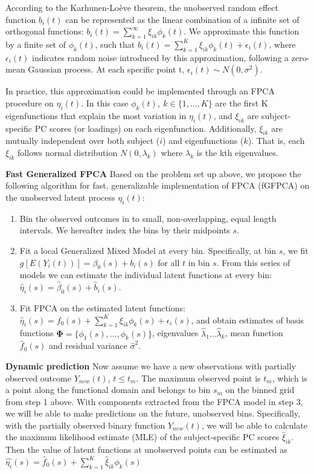 \documentclass[
  11pt,
]{article}
\providecommand{\tightlist}{%
  \setlength{\itemsep}{0pt}\setlength{\parskip}{0pt}}
\begin{document}
According to the Karhunen-Loève theorem, the unobserved random effect
function \(b_i(t)\) can be represented as the linear combination of a
infinite set of orthogonal functions:
\(b_i(t)=\sum_{k=1}^{\infty}\xi_{ik}\phi_{k}(t)\). We approximate this
function by a finite set of \(\phi_{k}(t)\), such that
\(b_i(t)=\sum_{k=1}^{K}\xi_{ik}\phi_{k}(t)+\epsilon_i(t)\), where
\(\epsilon_i(t)\) indicates random noise introduced by this
approximation, following a zero-mean Gaussian process. At each specific
point t, \(\epsilon_i(t) \sim N(0, \sigma^2)\).

In practice, this approximation could be implemented through an FPCA
procedure on \(\eta_i(t)\). In this case
\(\phi_{k}(t),\ k \in \{1,...,K\}\) are the first K eigenfunctions that
explain the most variation in \(\eta_i(t)\), and \(\xi_{ik}\) are
subject-specific PC scores (or loadings) on each eigenfunction.
Additionally, \(\xi_{ik}\) are mutually independent over both subject
(\(i\)) and eigenfunctions (\(k\)). That is, each \(\xi_{ik}\) follows
normal distribution \(N(0, \lambda_k)\) where \(\lambda_k\) is the kth
eigenvalues.

\textbf{Fast Generalized FPCA} Based on the problem set up above, we
propose the following algorithm for fast, generalizable implementation
of FPCA (fGFPCA) on the unobserved latent process \(\eta_i(t)\):

\begin{enumerate}
\def\labelenumi{\arabic{enumi}.}
\tightlist
\item
  Bin the observed outcomes in to small, non-overlapping, equal length
  intervals. We hereafter index the bins by their midpoints \(s\).
\item
  Fit a local Generalized Mixed Model at every bin. Specifically, at bin
  \(s\), we fit \(g[E(Y_i(t))] = \beta_0(s)+b_i(s)\) for all \(t\) in
  bin \(s\). From this series of models we can estimate the individual
  latent functions at every bin:
  \(\hat{\eta}_i(s) = \hat{\beta}_0(s)+\hat{b}_i(s)\).
\item
  Fit FPCA on the estimated latent functions:
  \(\hat{\eta}_i(s) = f_0(s)+\sum_{k=1}^K\xi_{ik}\phi_{k}(s)+\epsilon_i(s)\),
  and obtain estimates of basis functions
  \(\boldsymbol{\Phi} = \{\phi_1(s), ...,\phi_k(s)\}\), eigenvalues
  \(\hat{\lambda}_1...\hat{\lambda}_k\), mean function \(\hat{f}_0(s)\)
  and residual variance \(\hat{\sigma}^2\).
\end{enumerate}

\textbf{Dynamic prediction} Now assume we have a new observations with
partially observed outcome \(Y_{new}(t)\), \(t\leq t_m\). The maximum
observed point is \(t_m\), which is a point along the functional domain
and belongs to bin \(s_m\) on the binned grid from step 1 above. With
components extracted from the FPCA model in step 3, we will be able to
make predictions on the future, unobserved bins. Specifically, with the
partially observed binary function \(Y_{new}(t)\), we will be able to
calculate the maximum likelihood estimate (MLE) of the subject-specific
PC scores \(\hat{\xi}_{ik}\). Then the value of latent functions at
unobserved points can be estimated as
\(\hat{\eta_i}(s)=\hat{f}_0(s)+\sum_{k=1}^K\hat{\xi}_{ik}{\phi}_k(s)\)
\end{document}
